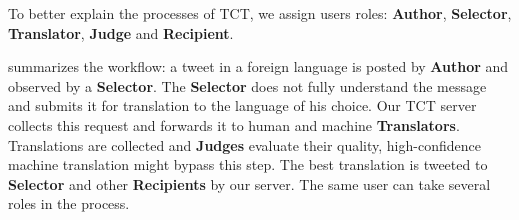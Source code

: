 \documentclass[11pt]{article}
\begin{document}
To better explain the processes of TCT, we assign users roles: 
\textbf{Author}, \textbf{Selector}, \textbf{Translator}, \textbf{Judge} 
and \textbf{Recipient}.

 summarizes the workflow: a tweet in a foreign language is
posted by \textbf{Author} and observed by a \textbf{Selector}. 
The \textbf{Selector} does not fully understand the message 
and submits it for translation to the language of his choice. 
Our TCT server collects this request and
forwards it to human and machine \textbf{Translators}. Translations 
are collected and \textbf{Judges} evaluate their quality, high-confidence
machine translation might bypass this step. The best
translation is tweeted to \textbf{Selector} and other \textbf{Recipients} 
by our server. 
The same user can take several roles in the process. 
\end{document}
